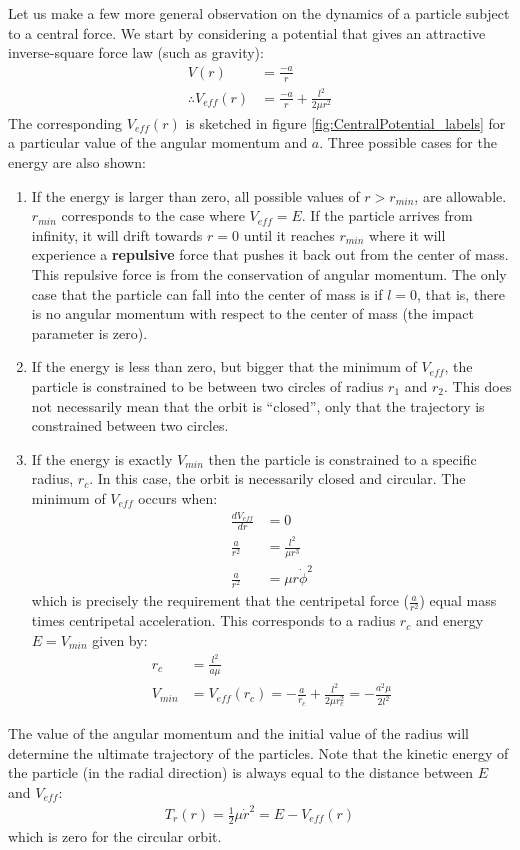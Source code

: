 Let us make a few more general observation on the dynamics of a particle subject to a central force. We start by considering a potential that gives an attractive inverse-square force law (such as gravity):
\begin{align}
V(r)&=\frac{-a}{r}\nonumber\\
\therefore V_{eff}(r)&= \frac{-a}{r}+\frac{l^2}{2\mu r^2}
\end{align}
The corresponding $V_{eff}(r)$ is sketched in figure \ref{fig:CentralPotential_labels} for a particular value of the angular momentum and $a$. Three possible cases for the energy are also shown:
\begin{enumerate}
\item If the energy is larger than zero, all possible values of $r>r_{min}$, are allowable. $r_{min}$ corresponds to the case where $V_{eff}=E$. If the particle arrives from infinity, it will drift towards $r=0$ until it reaches $r_{min}$ where it will experience a \textbf{repulsive} force that pushes it back out from the center of mass. This repulsive force is from the conservation of angular momentum. The only case that the particle can fall into the center of mass is if $l=0$, that is, there is no angular momentum with respect to the center of mass (the impact parameter is zero).
\item If the energy is less than zero, but bigger that the minimum of $V_{eff}$, the particle is constrained to be between two circles of radius $r_1$ and $r_2$. This does not necessarily mean that the orbit is ``closed'', only that the trajectory is constrained between two circles.
\item If the energy is exactly $V_{min}$ then the particle is constrained to a specific radius, $r_c$. In this case, the orbit is necessarily closed and circular. The minimum of $V_{eff}$ occurs when:
\begin{align}
\frac{dV_{eff}}{dr}&=0\nonumber\\
\frac{a}{r^2}&=\frac{l^2}{\mu r^3}\nonumber\\
\frac{a}{r^2}&=\mu r \dot\phi^2
\end{align}
which is precisely the requirement that the centripetal force ($\frac{a}{r^2}$) equal mass times centripetal acceleration. This corresponds to a radius $r_c$ and energy $E=V_{min}$ given by:
\begin{align}
r_c&=\frac{l^2}{a\mu}\nonumber\\
V_{min}&=V_{eff}(r_c)=-\frac{a}{r_c}+\frac{l^2}{2\mu r_c^2}=-\frac{a^2\mu}{2l^2}
\end{align}
\end{enumerate}
The value of the angular momentum and the initial value of the radius will determine the ultimate trajectory of the particles.
Note that the kinetic energy of the particle (in the radial direction) is always equal to the distance between $E$ and $V_{eff}$:
\begin{align}
T_r(r)=\frac{1}{2}\mu\dot r^2=E-V_{eff}(r)
\end{align}
which is zero for the circular orbit.

